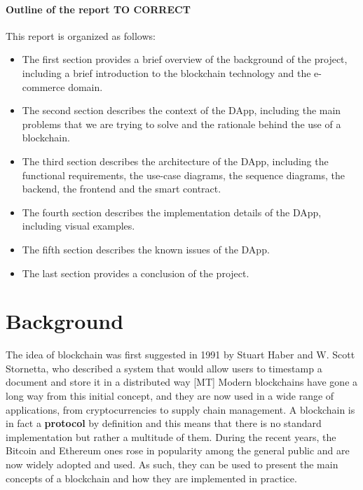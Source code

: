 \documentclass[12pt,a4paper,oneside]{article}
\theoremstyle{definition}
\begin{document}
\paragraph{Outline of the report TO CORRECT} This report is organized as follows:
\begin{itemize}
	\item The first section provides a brief overview of the background of the project, including a brief introduction to the blockchain technology and the e-commerce domain.
	\item The second section describes the context of the DApp, including the main problems that we are trying to solve and the rationale behind the use of a blockchain.
	\item The third section describes the architecture of the DApp, including the functional requirements, the use-case diagrams, the sequence diagrams, the backend, the frontend and the smart contract.
	\item The fourth section describes the implementation details of the DApp, including visual examples.
	\item The fifth section describes the known issues of the DApp.
	\item The last section provides a conclusion of the project.
\end{itemize}

\section{Background}

The idea of blockchain was first suggested in 1991 by Stuart Haber and W. Scott Stornetta, who described a system that would allow users to timestamp a document and store it in a distributed way [MT] Modern blockchains have gone a long way from this initial concept, and they are now used in a wide range of applications, from cryptocurrencies to supply chain management. A blockchain is in fact a \textbf{protocol} by definition and this means that there is no standard implementation but rather a multitude of them.
During the recent years, the Bitcoin and Ethereum ones rose in popularity among the general public and are now widely adopted and used. As such, they can be used to present the main concepts of a blockchain and how they are implemented in practice. \\
\end{document}
